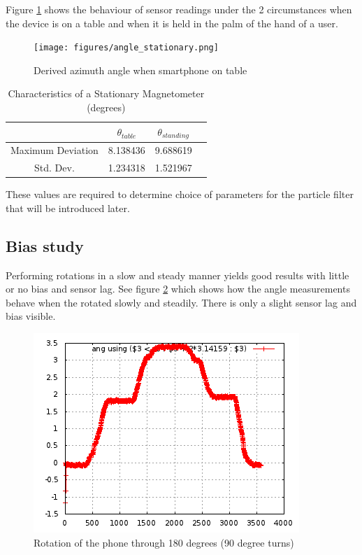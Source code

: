 Figure \ref{fig:angle_stationary_table}
shows the behaviour of sensor readings under the 2 circumstances when the 
device is on a table and when it is held in the palm of the hand of a user.

\begin{figure}\centering
    \texttt{[image: figures/angle\_stationary.png]}
    \caption{Derived azimuth angle when smartphone on table\label{fig:angle_stationary_table}}
\end{figure}


\begin{table}
\centering
\begin{tabular}{c c c c}
\hline
\hline
 & $\theta_{table}$ & $\theta_{standing}$ \\
\hline
Maximum Deviation & 8.138436 & 9.688619 \\
Std. Dev. & 1.234318 & 1.521967 \\
\hline
\end{tabular}
\caption{Characteristics of a Stationary Magnetometer (degrees)\label{tbl:angle_chars}}
\end{table}

These values are required to determine choice of parameters for the particle
filter that will be introduced later.

\subsection{Bias study}

Performing rotations in a slow and steady manner yields good results with little
or no bias and sensor lag. See figure \ref{fig:angle_180_rotation_table} which 
shows how the angle measurements behave when the rotated slowly and steadily.
There is only a slight sensor lag and bias visible.

\begin{figure}\centering
    \includegraphics{figures/angle_180_rotation_table.png}
    \caption{Rotation of the phone through 180 degrees (90 degree turns)\label{fig:angle_180_rotation_table}}
\end{figure}


